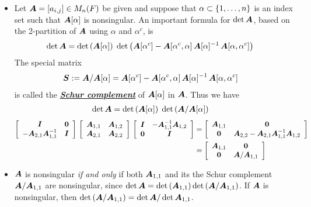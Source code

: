 \documentclass[11pt]{article}
\begin{document}
\begin{itemize}
\item Let $\boldsymbol{A} = [a_{i,j}] \in M_{n}(F)$ be given and suppose that $\alpha \subset \left\{1,\ldots,n\right\}$ is an index set such that $\boldsymbol{A}[\alpha]$ is nonsingular. An important formula for $\det{\boldsymbol{A}}$, based on the 2-partition of $\boldsymbol{A}$ using $\alpha$ and $\alpha^c$, is
\begin{align}
\det{\boldsymbol{A}} &= \det\left(\boldsymbol{A}[\alpha]\right)\; \det\left(\boldsymbol{A}[\alpha^{c}] - \boldsymbol{A}[\alpha^{c}, \alpha]\, \boldsymbol{A}[\alpha]^{-1}\, \boldsymbol{A}[ \alpha, \alpha^{c}]\right) \label{eqn: det_decom_schur}
\end{align}
The special matrix
\begin{align}
\boldsymbol{S}:= \boldsymbol{A}/ \boldsymbol{A}[\alpha] &=  \boldsymbol{A}[\alpha^{c}] - \boldsymbol{A}[\alpha^{c}, \alpha]\, \boldsymbol{A}[\alpha]^{-1}\, \boldsymbol{A}[ \alpha, \alpha^{c}] \label{eqn: schur_compl}
\end{align} is called the \underline{\textbf{\emph{Schur complement}}} of $\boldsymbol{A}[\alpha]$ in $\boldsymbol{A}$. Thus we have
\begin{align}
\det{\boldsymbol{A}} &=  \det\left(\boldsymbol{A}[\alpha]\right) \; \det\left(\boldsymbol{A}/ \boldsymbol{A}[\alpha]\right)\label{eqn: det_decom_schur2}
\end{align}
\begin{align}
 \left[ \begin{array}{cc}
\boldsymbol{I} & \boldsymbol{0}\\
-\boldsymbol{A}_{2,1}\boldsymbol{A}_{1,1}^{-1} &\boldsymbol{I} 
\end{array} \right]\, \left[ \begin{array}{cc}
\boldsymbol{A}_{1,1} & \boldsymbol{A}_{1,2}\\
\boldsymbol{A}_{2,1} & \boldsymbol{A}_{2,2}
\end{array} \right]\,
 \left[ \begin{array}{cc}
\boldsymbol{I}  & -\boldsymbol{A}_{1,1}^{-1}\boldsymbol{A}_{1,2} \\
\boldsymbol{0} & \boldsymbol{I} 
\end{array} \right] &= \left[ \begin{array}{cc}
\boldsymbol{A}_{1,1} & \boldsymbol{0}\\
\boldsymbol{0}&  \boldsymbol{A}_{2,2} - \boldsymbol{A}_{2,1} \boldsymbol{A}_{1,1}^{-1} \boldsymbol{A}_{1,2}
\end{array} \right]  \nonumber \\
&= \left[ \begin{array}{cc}
\boldsymbol{A}_{1,1} & \boldsymbol{0}\\
\boldsymbol{0}& \boldsymbol{A}/\boldsymbol{A}_{1,1}
\end{array} \right]\label{eqn: block_mat_diagonal_schur_comp} 
\end{align}

\item $\boldsymbol{A}$ is nonsingular \emph{if and only} if both $\boldsymbol{A}_{1,1}$ and its the Schur complement $\boldsymbol{A}/ \boldsymbol{A}_{1,1}$ are nonsingular, since $\det{\boldsymbol{A}} = \det\left(\boldsymbol{A}_{1,1}\right)\det\left(\boldsymbol{A}/ \boldsymbol{A}_{1,1}\right)$. If $\boldsymbol{A}$ is nonsingular, then $\det \left(\boldsymbol{A}/ \boldsymbol{A}_{1,1}\right) = \det \boldsymbol{A} / \det \boldsymbol{A}_{1,1}$.


\end{itemize}
\end{document}
